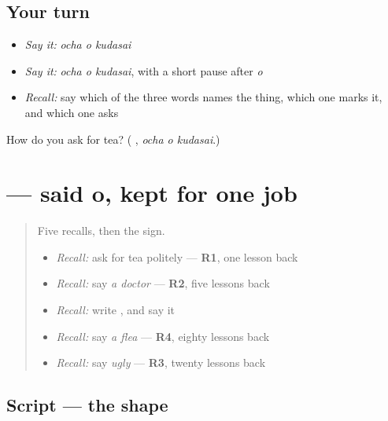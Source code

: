 \subsection*{Your turn}
\begin{itemize}
\raggedright
  \item \emph{Say it:} \emph{ocha o kudasai}
  \item \emph{Say it:} \emph{ocha o kudasai}, with a short pause after \emph{o}
  \item \emph{Recall:} say which of the three words names the thing, which one marks it, and which one asks
\end{itemize}

\begin{tcolorbox}[breakable,colback=teal!4,colframe=teal!35!black,title={Before you move on}]
How do you ask for tea? (\textbf{ }, \emph{ocha o kudasai}.)
\end{tcolorbox}
\section[\texorpdfstring{\ja{を} (wo)}{を (wo)}]{ — said o, kept for one job}

\label{lesson:JA-W131-wo}



\begin{quote}
Five recalls, then the sign.

\begin{itemize}
\raggedright
  \item \emph{Recall:} ask for tea politely — \textbf{R1}, one lesson back
  \item \emph{Recall:} say \emph{a doctor} — \textbf{R2}, five lessons back
  \item \emph{Recall:} write \textbf{}, and say it
  \item \emph{Recall:} say \emph{a flea} — \textbf{R4}, eighty lessons back
  \item \emph{Recall:} say \emph{ugly} — \textbf{R3}, twenty lessons back
\end{itemize}
\end{quote}

\subsection*{Script — the shape}

